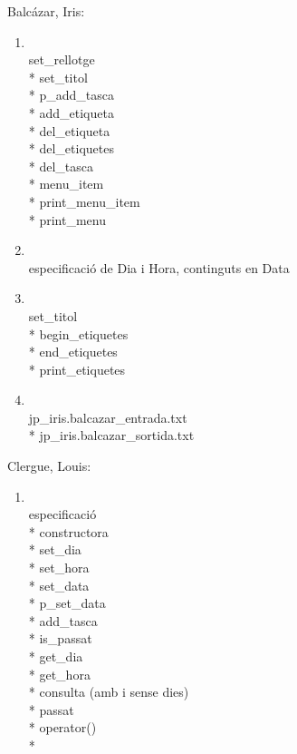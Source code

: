 \documentclass[a4paper,10pt]{article}
\begin{document}
\begin{description}
  \item \textsf{Balcázar, Iris}:
  \begin{enumerate}
    \item[Agenda] \hfill \\
    set\_rellotge \\*
    set\_titol \\*
    p\_add\_tasca \\*  
    add\_etiqueta \\*
    del\_etiqueta \\*
    del\_etiquetes \\*
    del\_tasca \\*
    menu\_item \\*
    print\_menu\_item \\*
    print\_menu
    \item[Data] \hfill \\
    especificaci\'o de Dia i Hora, continguts en Data
    \item[Tasca] \hfill \\
    set\_titol \\*
    begin\_etiquetes \\*
    end\_etiquetes \\*
    print\_etiquetes
    \item[Jocs de prova] \hfill \\
    jp\_iris.balcazar\_entrada.txt \\*
    jp\_iris.balcazar\_sortida.txt
  \end{enumerate}
  \item \textsf{Clergue, Louis}:
  \begin{enumerate}
    \item[Agenda] \hfill \\
    especificació \\*
    constructora \\*
    set\_dia \\*
    set\_hora \\*
    set\_data \\*
    p\_set\_data \\*
    add\_tasca \\*
    is\_passat \\*
    get\_dia \\*
    get\_hora \\*
    consulta (amb i sense dies) \\*
    passat \\*
    operator() \\*

\end{enumerate}
\end{description}
\end{document}
